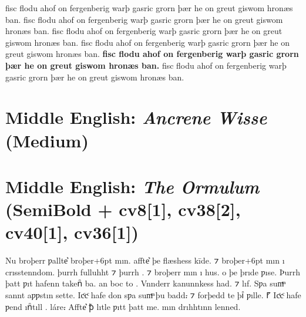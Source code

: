 \documentclass[12pt,letterpaper,openany]{book}
\begin{document}
{\extralight{} fisc flodu ahof on fergenberig warþ gasric grorn þær he on greut giswom hronæs ban.
\light{} fisc flodu ahof on fergenberig warþ gasric grorn þær he on greut giswom hronæs ban.
\medium{} fisc flodu ahof on fergenberig warþ gasric grorn þær he on greut giswom hronæs ban.
\semibold{} fisc flodu ahof on fergenberig warþ gasric grorn þær he on greut giswom hronæs ban.
\textbf{fisc flodu ahof on fergenberig warþ gasric grorn þær he on greut giswom hronæs ban.}
\extrabold{} fisc flodu ahof on fergenberig warþ gasric grorn þær he on greut giswom hronæs ban.}

\section{Middle English: \textit{Ancrene Wisse} (Medium)}

{\large\medium{}}

\section{Middle English: \textit{The Ormulum} (SemiBold + cv8[1], cv38[2], cv40[1], cv36[1])}

{\large\semibold{}
Nu broþerr ƿallte͛ broþer\kern-6ptᫍ\kern+6pt{} mın. affte͛ þe flæshess kīde. ⁊
broþer\kern-6ptᫍ\kern+6pt{} mın ı crısstenndom.
þurrh fulluhht ⁊ þurrh . ⁊ broþerr mın ı  hus.
 o þe þrıde ƿıse.
Þurrh þatt ƿıt hafenn takenᷠ ba. an  boc to .
Vnnderr kanunnkess had.
⁊ lıf. Sƿa sumͫ sannt aƿƿstın sette. Icͨcͨ hafe don sƿa sumͫ þu badd⹎ ⁊ forþedd te
þıᷠ ƿılle. ⹍ Icͨcͨ hafe ƿend ınᷠtıll . 
 láre⹎ Affte͛ ꝥ lıtᫎle
ƿıtt þatt me. mın drıhhtınn  lenned.}
\end{document}
